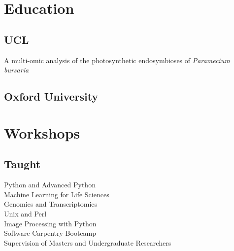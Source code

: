 \documentclass[]{Finlay_Maguire_CV}
\begin{document}
%
%
\lastupdated

%
%

%
%

\begin{minipage}[t]{0.33\textwidth} 


\section{Education} 

\subsection{UCL}
A multi-omic analysis of the photosynthetic endosymbioses of \textit{Paramecium bursaria} \\
\sectionsep

\subsection{Oxford University}
\sectionsep



\section{Workshops}
\subsection{Taught}
Python and Advanced Python\\
Machine Learning for Life Sciences\\
Genomics and Transcriptomics\\
Unix and Perl\\
Image Processing with Python\\
Software Carpentry Bootcamp\\
Supervision of Masters and Undergraduate Researchers\\
\sectionsep


\end{minipage}
\end{document}
